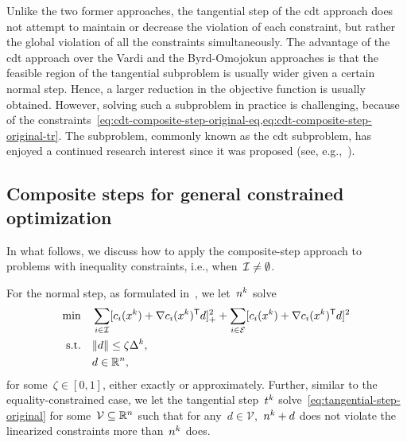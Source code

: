 Unlike the two former approaches, the tangential step of the \gls{cdt} approach does not attempt to maintain or decrease the violation of each constraint, but rather the global violation of all the constraints simultaneously.
The advantage of the \gls{cdt} approach over the Vardi and the Byrd-Omojokun approaches is that the feasible region of the tangential subproblem is usually wider given a certain normal step.
Hence, a larger reduction in the objective function is usually obtained.
However, solving such a subproblem in practice is challenging, because of the constraints~\cref{eq:cdt-composite-step-original-eq,eq:cdt-composite-step-original-tr}.
The subproblem, commonly known as the \gls{cdt} subproblem, has enjoyed a continued research interest since it was proposed (see, e.g.,~\cite{Chen_Yuan_1999,Ai_Zhang_2009,Bomze_Overton_2015,Bienstock_2016,Xu_Xia_Wang_2021}).

\subsection{Composite steps for general constrained optimization}
\label{subsec:composite-step-inequality}

In what follows, we discuss how to apply the composite-step approach to problems with inequality constraints, i.e., when~$\mathcal{I} \neq \emptyset$.

For the normal step, as formulated in~\cite[\S~15.4.4]{Conn_Gould_Toint_2000}, we let~$\nstep[k]$ solve
\begin{subequations}
    \label{eq:byrd-omojokun}
    \begin{align}
        \min        & \quad \sum_{i \in \iub} \posp{\con{i}(\iter[k]) + \nabla \con{i}(\iter[k])^{\T} \step}^2 + \sum_{i \in \ieq} [\con{i}(\iter[k]) + \nabla \con{i}(\iter[k])^{\T} \step]^2 \label{eq:byrd-omojokun-obj}\\
        \text{s.t.} & \quad \norm{\step} \le \zeta \rad[k],\\
                    & \quad \step \in \R^n, \nonumber
    \end{align}
\end{subequations}
for some~$\zeta \in [0, 1]$, either exactly or approximately.
Further, similar to the equality-constrained case, we let the tangential step~$\tstep[k]$ solve~\cref{eq:tangential-step-original} for some~$\mathcal{V} \subseteq \mathbb{R}^n$ such that for any~$d \in \mathcal{V}$,~$\nstep[k] + \step$ does not violate the linearized constraints more than~$\nstep[k]$ does.

